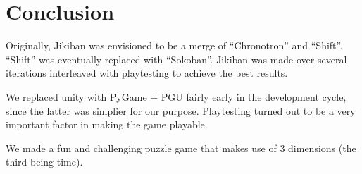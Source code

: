 \newpage
\section{Conclusion} 
Originally, Jikiban was envisioned to be a merge of ``Chronotron'' and
``Shift''.  ``Shift'' was eventually replaced with ``Sokoban''.
Jikiban was made over several iterations interleaved with playtesting
to achieve the best results.

We replaced unity with PyGame + PGU fairly early in the development
cycle, since the latter was simplier for our purpose.  Playtesting
turned out to be a very important factor in making the game playable.

We made a fun and challenging puzzle game that makes use of 3
dimensions (the third being time).


